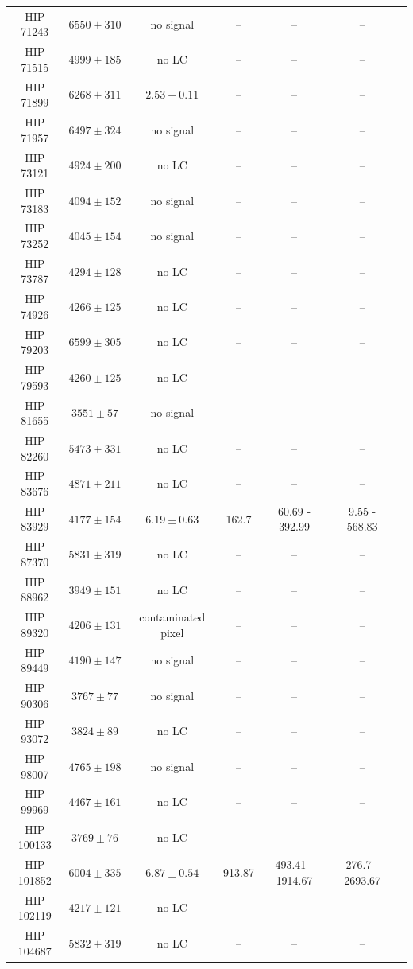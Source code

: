 \begin{longtable}{|c|c|c|c|c|c|c|}
HIP 71243 & $ 6550 \pm 310 $ & no signal &-- &-- &-- \\
HIP 71515 & $ 4999 \pm 185 $ & no LC &-- &-- &-- \\
HIP 71899 & $ 6268 \pm 311 $ & $ 2.53 \pm 0.11 $ &-- &-- &-- \\
HIP 71957 & $ 6497 \pm 324 $ & no signal &-- &-- &-- \\
HIP 73121 & $ 4924 \pm 200 $ & no LC &-- &-- &-- \\
HIP 73183 & $ 4094 \pm 152 $ & no signal &-- &-- &-- \\
HIP 73252 & $ 4045 \pm 154 $ & no signal &-- &-- &-- \\
HIP 73787 & $ 4294 \pm 128 $ & no LC &-- &-- &-- \\
HIP 74926 & $ 4266 \pm 125 $ & no LC &-- &-- &-- \\
HIP 79203 & $ 6599 \pm 305 $ & no LC &-- &-- &-- \\
HIP 79593 & $ 4260 \pm 125 $ & no LC &-- &-- &-- \\
HIP 81655 & $ 3551 \pm 57 $ & no signal &-- &-- &-- \\
HIP 82260 & $ 5473 \pm 331 $ & no LC &-- &-- &-- \\
HIP 83676 & $ 4871 \pm 211 $ & no LC &-- &-- &-- \\
HIP 83929 & $ 4177 \pm 154 $ &$ 6.19 \pm 0.63 $ & 162.7 & 60.69 - 392.99 & 9.55 - 568.83 \\
HIP 87370 & $ 5831 \pm 319 $ & no LC &-- &-- &-- \\
HIP 88962 & $ 3949 \pm 151 $ & no LC &-- &-- &-- \\
HIP 89320 & $ 4206 \pm 131 $ & contaminated pixel &-- &-- &-- \\
HIP 89449 & $ 4190 \pm 147 $ & no signal &-- &-- &-- \\
HIP 90306 & $ 3767 \pm 77 $ & no signal &-- &-- &-- \\
HIP 93072 & $ 3824 \pm 89 $ & no LC &-- &-- &-- \\
HIP 98007 & $ 4765 \pm 198 $ & no signal &-- &-- &-- \\
HIP 99969 & $ 4467 \pm 161 $ & no LC &-- &-- &-- \\
HIP 100133 & $ 3769 \pm 76 $ & no LC &-- &-- &-- \\
HIP 101852 & $ 6004 \pm 335 $ &$ 6.87 \pm 0.54 $ & 913.87 & 493.41 - 1914.67 & 276.7 - 2693.67 \\
HIP 102119 & $ 4217 \pm 121 $ & no LC &-- &-- &-- \\
HIP 104687 & $ 5832 \pm 319 $ & no LC &-- &-- &-- \\

\end{longtable}
